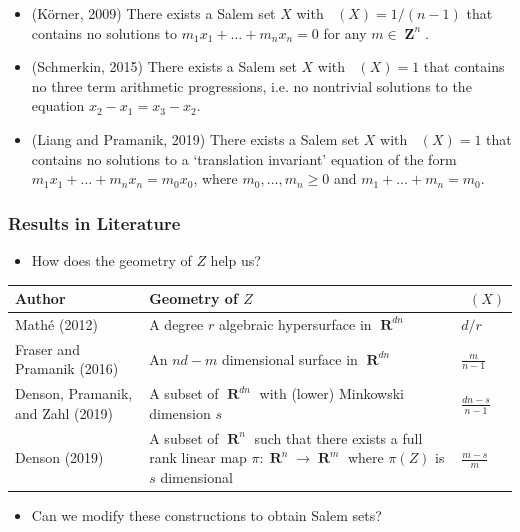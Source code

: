 \documentclass[usenames,dvipsnames,handout]{beamer}
\DeclareMathOperator{\RR}{\textbf{R}}
\DeclareMathOperator{\ZZ}{\textbf{Z}}
\DeclareMathOperator{\fordim}{\text{dim}_{\textbf{F}}}
\DeclareMathOperator{\hausdim}{\text{dim}_{\textbf{H}}}
\begin{document}
\begin{frame}
    \begin{itemize}
        \pause
        \item (K\"{o}rner, 2009) There exists a Salem set $X$ with $\fordim(X) = 1/(n-1)$ that contains no solutions to $m_1x_1 + \dots + m_nx_n = 0$ for any $m \in \ZZ^n$.

        \pause
        \item (Schmerkin, 2015) There exists a Salem set $X$ with $\fordim(X) = 1$ that contains no three term arithmetic progressions, i.e. no nontrivial solutions to the equation $x_2 - x_1 = x_3 - x_2$.

        \pause
        \item (Liang and Pramanik, 2019) There exists a Salem set $X$ with $\fordim(X) = 1$ that contains no solutions to a `translation invariant' equation of the form $m_1x_1 + \dots + m_n x_n = m_0 x_0$, where $m_0,\dots,m_n \geq 0$ and $m_1 + \dots + m_n = m_0$.
    \end{itemize}
\end{frame}


\begin{frame}
    \frametitle{Results in Literature}

    \begin{itemize}
        \item How does the geometry of $Z$ help us?
    \end{itemize}

    \begin{center}
    \begin{tabular}{| p{4cm} | p{4cm} | p{1.5cm} |}
        \hline
        Author & Geometry of $Z$ & $\hausdim(X)$\\
        \hline
        Math\'{e} (2012) & A degree $r$ algebraic hypersurface in $\RR^{dn}$ & $d/r$\\
        \hline
        Fraser and Pramanik (2016) & An $nd - m$ dimensional surface in $\RR^{dn}$ & $\frac{m}{n-1}$\\
        \hline
        Denson, Pramanik, and Zahl (2019) & A subset of $\RR^{dn}$ with (lower) Minkowski dimension $s$ & $\frac{dn - s}{n - 1}$\\
        \hline
        Denson (2019) & A subset of $\RR^n$ such that there exists a full rank linear map $\pi: \RR^n \to \RR^m$ where $\pi(Z)$ is $s$ dimensional & $\frac{m - s}{m}$\\
        \hline
    \end{tabular}
    \end{center}

    \begin{itemize}
        \item Can we modify these constructions to obtain Salem sets?
    \end{itemize}
\end{frame}
\end{document}
